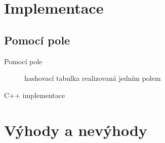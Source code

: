 \documentclass[utf8x]{beamer}
\begin{document}
\section{Implementace}
\subsection{Pomocí pole}

\begin{frame}{Pomocí pole}

\begin{figure}[h]

\centering
{}
\caption{hashovací tabulka realizovaná jedním polem}

\end{figure}

\end{frame}

\begin{frame}{C++ implementace}

\end{frame}

\section{Výhody a nevýhody}
\end{document}
